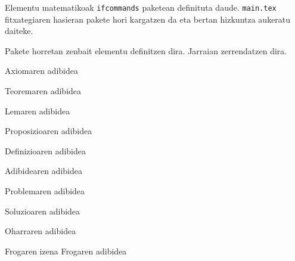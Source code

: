 Elementu matematikoak \texttt{ifcommands} paketean definituta daude. \texttt{main.tex} fitxategiaren hasieran pakete hori kargatzen da eta bertan hizkuntza aukeratu daiteke.

Pakete horretan zenbait elementu definitzen dira. Jarraian zerrendatzen dira.

\begin{ifaxiom}
	Axiomaren adibidea
\end{ifaxiom}

\begin{iftheorem}
	Teoremaren adibidea
\end{iftheorem}

\begin{iflemma}
	Lemaren adibidea
\end{iflemma}

\begin{ifproposition}
	Proposizioaren adibidea
\end{ifproposition}

\begin{ifdefinition}
	Definizioaren adibidea
\end{ifdefinition}

\begin{ifexample}
	Adibidearen adibidea
\end{ifexample}

\begin{ifproblem}
	Problemaren adibidea
\end{ifproblem}

\begin{ifsolution}
	Soluzioaren adibidea
\end{ifsolution}

\begin{ifremark}
	Oharraren adibidea
\end{ifremark}

\begin{ifproof}{Frogaren izena}
	Frogaren adibidea \iqed
\end{ifproof}

